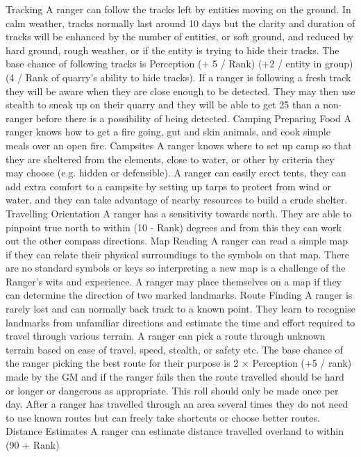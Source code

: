 \documentclass[a4paper]{article}
\begin{document}
\begin{multicols}{3}
Tracking A ranger can follow the tracks left by
entities moving on the ground. In calm weather,
tracks normally last around 10 days but the clarity
and duration of tracks will be enhanced by the
number of entities, or soft ground, and reduced by
hard ground, rough weather, or if the entity is
trying to hide their tracks. The base chance of
following tracks is Perception (+ 5 / Rank) (+2 /
entity in group) (4 / Rank of quarry’s ability to hide
tracks). If a ranger is following a fresh track they
will be aware when they are close enough to be
detected. They may then use stealth to sneak up on
their quarry and they will be able to get 25%
than a non-ranger before there is a possibility of
being detected.
Camping
Preparing Food A ranger knows how to get a fire
going, gut and skin animals, and cook simple meals
over an open fire.
Campsites A ranger knows where to set up camp
so that they are sheltered from the elements, close
to water, or other by criteria they may choose (e.g.
hidden or defensible).
A ranger can easily erect tents, they can add extra
comfort to a campsite by setting up tarps to protect
from wind or water, and they can take advantage of
nearby resources to build a crude shelter.
Travelling
Orientation A ranger has a sensitivity towards
north. They are able to pinpoint true north to within
(10 - Rank) degrees and from this they can work
out the other compass directions.
Map Reading A ranger can read a simple map if
they can relate their physical surroundings to the
symbols on that map. There are no standard symbols or keys so interpreting a new map is a challenge of the Ranger’s wits and experience. A
ranger may place themselves on a map if they can
determine the direction of two marked landmarks.
Route Finding A ranger is rarely lost and can
normally back track to a known point. They learn
to recognise landmarks from unfamiliar directions
and estimate the time and effort required to travel
through various terrain. A ranger can pick a route
through unknown terrain based on ease of travel,
speed, stealth, or safety etc. The base chance of the
ranger picking the best route for their purpose is 2
× Perception (+5 / rank)%
made by the GM and if the ranger fails then the
route travelled should be hard or longer or dangerous as appropriate. This roll should only be made
once per day.
After a ranger has travelled through an area several
times they do not need to use known routes but can
freely take shortcuts or choose better routes.
Distance Estimates A ranger can estimate distance
travelled overland to within (90 + Rank)%

\end{multicols}
\end{document}
